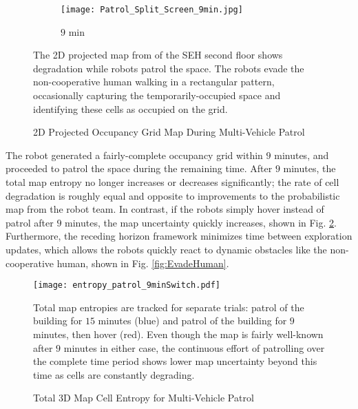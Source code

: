 \begin{figure}[!t]
{    	\begin{subfigure}[t]{0.25\columnwidth}
          	\texttt{[image: Patrol\_Split\_Screen\_9min.jpg]}
        		\caption{$9$ min}
    	\end{subfigure}
	}
	\caption{2D Projected Occupancy Grid Map During Multi-Vehicle Patrol}
	\medskip
	\small
	The 2D projected map from of the SEH second floor shows degradation while robots patrol the space. The robots evade the non-cooperative human walking in a rectangular pattern, occasionally capturing the temporarily-occupied space and identifying these cells as occupied on the grid.
	\label{fig:Sim2DMapPatrol}
\end{figure}




The robot generated a fairly-complete occupancy grid within $9$ minutes, and proceeded to patrol the space during the remaining time. After $9$ minutes, the total map entropy no longer increases or decreases significantly; the rate of cell degradation is roughly equal and opposite to improvements to the probabilistic map from the robot team. In contrast, if the robots simply hover instead of patrol after $9$ minutes, the map uncertainty quickly increases, shown in Fig. \ref{fig:DegradeExamples}. Furthermore, the receding horizon framework minimizes time between exploration updates, which allows the robots quickly react to dynamic obstacles like the non-cooperative human, shown in Fig. \ref{fig:EvadeHuman}.

\begin{figure}
	\centering
	\texttt{[image: entropy\_patrol\_9minSwitch.pdf]}
	\caption{Total 3D Map Cell Entropy for Multi-Vehicle Patrol}
	\medskip
	\small
	Total map entropies are tracked for separate trials: patrol of the building for $15$ minutes (blue) and patrol of the building for $9$ minutes, then hover (red). Even though the map is fairly well-known after $9$ minutes in either case, the continuous effort of patrolling over the complete time period shows lower map uncertainty beyond this time as cells are constantly degrading.
	\label{fig:DegradeExamples}
\end{figure}


